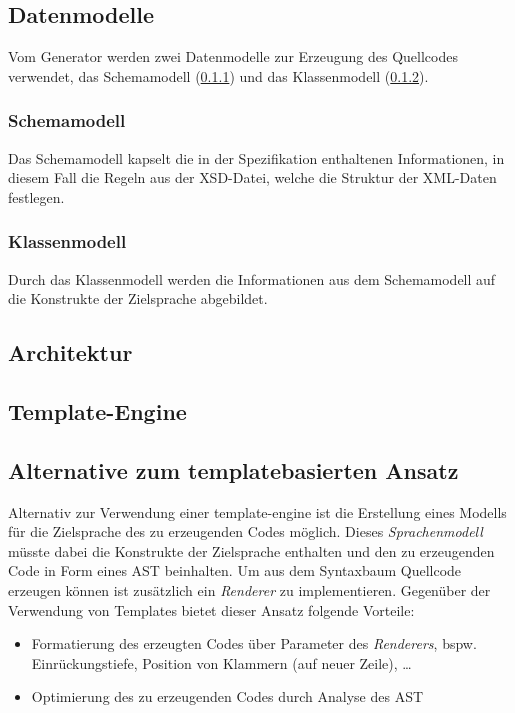 \documentclass[a4paper]{scrartcl}
\begin{document}
    \subsection{Datenmodelle}

    Vom Generator werden zwei Datenmodelle zur Erzeugung des Quellcodes verwendet, das Schemamodell (\cref{sec:schemamodel}) und das Klassenmodell (\cref{sec:classmodel}).

    \subsubsection{Schemamodell}
    \label{sec:schemamodel}

    Das Schemamodell kapselt die in der Spezifikation enthaltenen Informationen, in diesem Fall die Regeln aus der \gls{XSD}-Datei, welche die Struktur der XML-Daten festlegen.

    \subsubsection{Klassenmodell}
    \label{sec:classmodel}

    Durch das Klassenmodell werden die Informationen aus dem Schemamodell auf die Konstrukte der Zielsprache abgebildet.

    \subsection{Architektur}

    \subsection{Template-Engine}

    \subsection{Alternative zum templatebasierten Ansatz}

    Alternativ zur Verwendung einer \gls{template-engine} ist die Erstellung eines Modells für die Zielsprache des zu erzeugenden Codes möglich. Dieses \emph{Sprachenmodell} müsste dabei die Konstrukte der Zielsprache enthalten und den zu erzeugenden Code in Form eines \gls{AST} beinhalten.
    Um aus dem Syntaxbaum Quellcode erzeugen können ist zusätzlich ein \emph{Renderer} zu implementieren. Gegenüber der Verwendung von Templates bietet dieser Ansatz folgende Vorteile:

    \begin{itemize}
        \item Formatierung des erzeugten Codes über Parameter des \emph{Renderers}, bspw. Einrückungstiefe, Position von Klammern (auf neuer Zeile), \ldots
        \item Optimierung des zu erzeugenden Codes durch Analyse des \gls{AST}
    \end{itemize}
\end{document}
